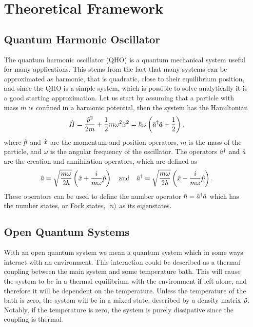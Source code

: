 \section{Theoretical Framework}
\subsection{Quantum Harmonic Oscillator}
The quantum harmonic oscillator (QHO) is a quantum mechanical system useful for many applications. This stems from the fact that many systems can be approximated as harmonic, that is quadratic, close to their equilibrium position, and since the QHO is a simple system, which is possible to solve analytically it is a good starting approximation. Let us start by assuming that a particle with mass $m$ is confined in a harmonic potential, then the system has the Hamiltonian
\begin{equation}
    \hat{H} = \frac{\hat{p}^2}{2m} + \frac{1}{2}m\omega^2\hat{x}^2 = \hbar\omega\left(\hat{a}^{\dagger}\hat{a} + \frac{1}{2}\right), \label{eq:hamiltonian}
\end{equation}
where $\hat{p}$ and $\hat{x}$ are the momentum and position operators, $m$ is the mass of the particle, and $\omega$ is the angular frequency of the oscillator. The operators $\hat{a}^{\dagger}$ and $\hat{a}$ are the creation and annihilation operators, which are defined as
\begin{equation}
    \hat{a} = \sqrt{\frac{m\omega}{2\hbar}} \left(\hat{x} + \frac{i}{m\omega} \hat{p}\right) \quad \text{and} \quad \hat{a}^{\dagger} = \sqrt{\frac{m\omega}{2\hbar}} \left(\hat{x} - \frac{i}{m\omega} \hat{p}\right).
\end{equation}
These operators can be used to define the number operator $\hat{n} = \hat{a}^{\dagger}\hat{a}$ which has the number states, or Fock states, $\ket{n}$ as its eigenstates.

\subsection{Open Quantum Systems}
With an open quantum system we mean a quantum system which in some ways interact with an environment. This interaction could be described as a thermal coupling between the main system and some temperature bath. This will cause the system to be in a thermal equilibrium with the environment if left alone, and therefore it will be dependent on the temperature. Unless the temperature of the bath is zero, the system will be in a mixed state, described by a density matrix $\hat{\rho}$. Notably, if the temperature is zero, the system is purely dissipative since the coupling is thermal. \cite{Annby-Andersson:2024}

